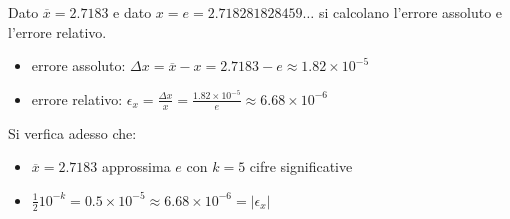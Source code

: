\begin{center}
\footnotesize\noindent{}\end{center}

\noindent Dato \(\overline{x} = 2.7183\) e dato \(x = e = 2.718281828459\ldots \) si calcolano l'errore assoluto e l'errore relativo.

\begin{itemize}

\item errore assoluto: \(\Delta x = \overline{x} - x = 2.7183 - e \approx 1.82 \times 10^{-5}\)
\item errore relativo: \(\epsilon_x = \frac{\Delta x}{x} = \frac{ 1.82 \times 10^{-5}}{e} \approx 6.68 \times 10^{-6}\)

\end{itemize}

\noindent Si verfica adesso che:

\begin{itemize}
\item \(\overline{x} = 2.7183\) approssima \(e\) con \(k=5\) cifre significative
\item \( \frac{1}{2}10^{-k} = 0.5 \times 10^{-5} \approx 6.68 \times 10^{-6} = |\epsilon_x|\)
\end{itemize}
